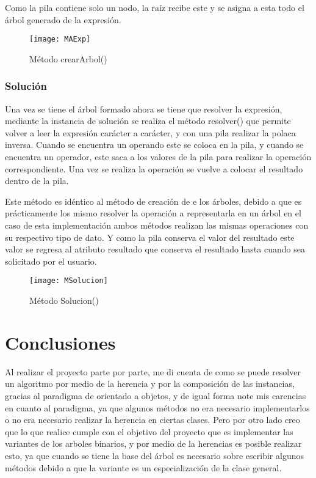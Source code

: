 \documentclass[12pt,a4paper]{article}
\begin{document}
	Como la pila contiene solo un nodo, la raíz recibe este y se asigna a esta todo el árbol generado de la expresión. 

		\begin{figure}[h]
			\centering
			\texttt{[image: MAExp]}
			\caption{Método crearArbol()}
		\end{figure}
		
			\subsubsection{Solución}
	
	Una vez se tiene el árbol formado ahora se tiene que resolver la expresión,  mediante la instancia de solución se realiza el método resolver() que permite volver a leer la expresión carácter a carácter, y con una pila realizar la polaca inversa. Cuando se encuentra un operando este se coloca en la pila, y cuando se encuentra un operador, este saca a los valores de la pila para realizar la operación correspondiente. Una vez se realiza la operación se vuelve a colocar el resultado dentro de la pila.
	
	Este método es idéntico al método de creación de e los árboles, debido a que es prácticamente los mismo resolver la operación a representarla en un árbol en el caso de esta implementación ambos métodos realizan las mismas operaciones con su respectivo tipo de dato. Y como la pila conserva el valor del resultado este valor se regresa al atributo resultado que conserva el resultado hasta cuando sea solicitado por el usuario.

	\begin{figure}[h]
			\centering
			\texttt{[image: MSolucion]}
			\caption{Método Solucion()}
		\end{figure}
		
	\section{Conclusiones}
	Al realizar el proyecto parte por parte, me di cuenta de como se puede resolver un algoritmo por medio de la herencia y por la composición de las instancias, gracias al paradigma de orientado a objetos, y de igual forma note mis carencias en cuanto al paradigma, ya que algunos métodos no era necesario implementarlos o no era necesario realizar la herencia en ciertas clases. Pero por otro lado creo que lo que realice cumple con el objetivo del proyecto que es implementar las variantes de los arboles binarios, y por medio de la herencias es posible realizar esto, ya que cuando se tiene la base del árbol es necesario sobre escribir algunos métodos debido a que la variante es un especialización de la clase general.
	
\end{document}
